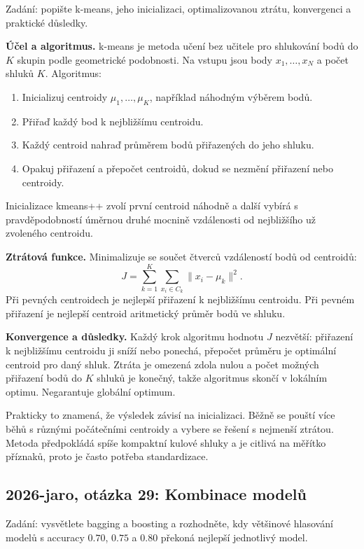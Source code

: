 Zadání: popište k-means, jeho inicializaci, optimalizovanou ztrátu, konvergenci a praktické
důsledky.

\begin{odpoved}
\textbf{Účel a algoritmus.} k-means je metoda učení bez učitele pro shlukování bodů do $K$
skupin podle geometrické podobnosti. Na vstupu jsou body $x_1,\ldots,x_N$ a počet shluků
$K$. Algoritmus:
\begin{enumerate}
  \item Inicializuj centroidy $\mu_1,\ldots,\mu_K$, například náhodným výběrem bodů.
  \item Přiřaď každý bod k nejbližšímu centroidu.
  \item Každý centroid nahraď průměrem bodů přiřazených do jeho shluku.
  \item Opakuj přiřazení a přepočet centroidů, dokud se nezmění přiřazení nebo centroidy.
\end{enumerate}
Inicializace kmeans++ zvolí první centroid náhodně a další vybírá s pravděpodobností
úměrnou druhé mocnině vzdálenosti od nejbližšího už zvoleného centroidu.

\textbf{Ztrátová funkce.} Minimalizuje se součet čtverců vzdáleností bodů od centroidů:
\[
J=\sum_{k=1}^K\sum_{x_i\in C_k}\|x_i-\mu_k\|^2.
\]
Při pevných centroidech je nejlepší přiřazení k nejbližšímu centroidu. Při pevném
přiřazení je nejlepší centroid aritmetický průměr bodů ve shluku.

\textbf{Konvergence a důsledky.} Každý krok algoritmu hodnotu $J$ nezvětší: přiřazení k
nejbližšímu centroidu ji sníží nebo ponechá, přepočet průměru je optimální centroid pro
daný shluk. Ztráta je omezená zdola nulou a počet možných přiřazení bodů do $K$ shluků je
konečný, takže algoritmus skončí v lokálním optimu. Negarantuje globální optimum.

Prakticky to znamená, že výsledek závisí na inicializaci. Běžně se pouští více běhů s
různými počátečními centroidy a vybere se řešení s nejmenší ztrátou. Metoda předpokládá
spíše kompaktní kulové shluky a je citlivá na měřítko příznaků, proto je často potřeba
standardizace.
\end{odpoved}

\subsection{2026-jaro, otázka 29: Kombinace modelů}

Zadání: vysvětlete bagging a boosting a rozhodněte, kdy většinové hlasování modelů s
accuracy $0.70$, $0.75$ a $0.80$ překoná nejlepší jednotlivý model.

